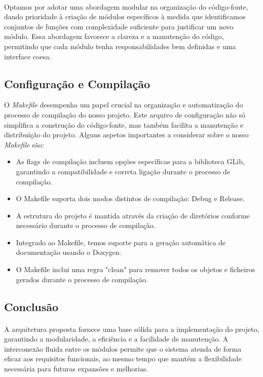 \documentclass{article}
\begin{document}
\paragraph{}Optamos por adotar uma abordagem modular na organização do código-fonte, dando prioridade à criação de módulos específicos à medida que identificamos conjuntos de funções com complexidade suficiente para justificar um novo módulo. Essa abordagem favorece a clareza e a manutenção do código, permitindo que cada módulo tenha responsabilidades bem definidas e uma interface coesa.

\subsection{Configuração e Compilação}
O \textit{Makefile} desempenha um papel crucial na organização e automatização do processo de compilação do nosso projeto. Este arquivo de configuração não só simplifica a construção do código-fonte, mas também facilita a manutenção e distribuição do projeto.
Alguns aspetos importantes a considerar sobre o nosso \textit{Makefile} são:
\begin{itemize}
\vspace{-0.2cm}
\item As flags de compilação incluem opções específicas para a biblioteca GLib, garantindo a compatibilidade e correta ligação durante o processo de compilação.
\item O Makefile suporta dois modos distintos de compilação: Debug e Release.
\item A estrutura do projeto é mantida através da criação de diretórios conforme necessário durante o processo de compilação.
\item Integrado ao Makefile, temos suporte para a geração automática de documentação usando o Doxygen.
\item O Makefile inclui uma regra "clean" para remover todos os objetos e ficheiros gerados durante o processo de compilação.
\end{itemize}

\subsection{Conclusão}
\paragraph{}A arquitetura proposta fornece uma base sólida para a implementação do projeto, garantindo a modularidade, a eficiência e a facilidade de manutenção. A interconexão fluida entre os módulos permite que o sistema atenda de forma eficaz aos requisitos funcionais, ao mesmo tempo que mantém a flexibilidade necessária para futuras expansões e melhorias.
\end{document}
